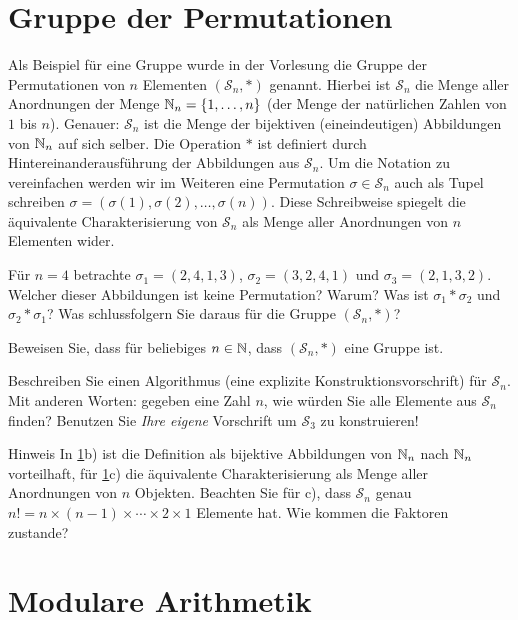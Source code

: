 \documentclass{scrartcl}
\newcommand{\permN}{\mathcal{S}_n}
\begin{document}
\maketitle

\section{Gruppe der Permutationen}
\label{groupperm}
Als Beispiel für eine Gruppe wurde in der Vorlesung die Gruppe der Permutationen von $n$ Elementen $(\permN{}, \ast)$ genannt.
Hierbei ist $\permN$ die Menge aller Anordnungen der Menge $\mathbb{N}_n = \{1,\ldots,n\}$ (der Menge der natürlichen Zahlen von $1$ bis $n$).
Genauer: $\permN$ ist die Menge der bijektiven (eineindeutigen) Abbildungen von $\mathbb{N}_n$ auf sich selber.
Die Operation $\ast$ ist definiert durch Hintereinanderausführung der Abbildungen aus $\permN$.
Um die Notation zu vereinfachen werden wir im Weiteren eine Permutation $\sigma \in \permN$ auch als Tupel schreiben $\sigma = (\sigma(1), \sigma(2), \ldots, \sigma(n))$.
Diese Schreibweise spiegelt die äquivalente Charakterisierung von $\permN$ als Menge aller Anordnungen von $n$ Elementen wider.
\begin{subex} 
  \item Für $n=4$ betrachte $\sigma_1 = (2, 4, 1, 3)$, $\sigma_2 = (3, 2, 4 , 1)$ und $\sigma_3 = (2, 1, 3, 2)$.
  Welcher dieser Abbildungen ist keine Permutation?
  Warum?
  Was ist $\sigma_1 \ast \sigma_2$ und $\sigma_2 \ast \sigma_1$?
  Was schlussfolgern Sie daraus für die Gruppe $(\permN,\ast)$?
  \item Beweisen Sie, dass für beliebiges $n \in \mathbb{N}$, dass $(\permN,\ast)$ eine Gruppe ist.
  \item Beschreiben Sie einen Algorithmus (eine explizite Konstruktionsvorschrift) für $\permN$.
  Mit anderen Worten: gegeben eine Zahl $n$, wie würden Sie alle Elemente aus $\permN$ finden?
  Benutzen Sie \emph{Ihre eigene} Vorschrift um $\mathcal{S}_3$ zu konstruieren!
\end{subex}
\begin{remark}{Hinweis}
  In \ref{groupperm}b) ist die Definition als bijektive Abbildungen von $\mathbb{N}_n$ nach $\mathbb{N}_n$ vorteilhaft, für  \ref{groupperm}c) die äquivalente Charakterisierung als Menge aller Anordnungen von $n$ Objekten.
  Beachten Sie für c), dass $\permN$ genau $n! = n \times (n-1) \times \cdots \times 2 \times 1$ Elemente hat.
  Wie kommen die Faktoren zustande?
\end{remark}


\section{Modulare Arithmetik}
\end{document}
